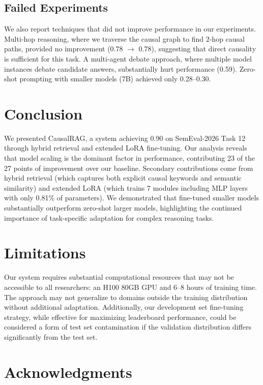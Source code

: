 \documentclass[11pt]{article}
\begin{document}
\subsection{Failed Experiments}

We also report techniques that did not improve performance in our experiments. Multi-hop reasoning, where we traverse the causal graph to find 2-hop causal paths, provided no improvement (0.78 $\rightarrow$ 0.78), suggesting that direct causality is sufficient for this task. A multi-agent debate approach, where multiple model instances debate candidate answers, substantially hurt performance (0.59). Zero-shot prompting with smaller models (7B) achieved only 0.28--0.30.

\section{Conclusion}

We presented CausalRAG, a system achieving 0.90 on SemEval-2026 Task 12 through hybrid retrieval and extended LoRA fine-tuning. Our analysis reveals that model scaling is the dominant factor in performance, contributing 23 of the 27 points of improvement over our baseline. Secondary contributions come from hybrid retrieval (which captures both explicit causal keywords and semantic similarity) and extended LoRA (which trains 7 modules including MLP layers with only 0.81\% of parameters). We demonstrated that fine-tuned smaller models substantially outperform zero-shot larger models, highlighting the continued importance of task-specific adaptation for complex reasoning tasks.

\section*{Limitations}

Our system requires substantial computational resources that may not be accessible to all researchers: an H100 80GB GPU and 6--8 hours of training time. The approach may not generalize to domains outside the training distribution without additional adaptation. Additionally, our development set fine-tuning strategy, while effective for maximizing leaderboard performance, could be considered a form of test set contamination if the validation distribution differs significantly from the test set.

\section*{Acknowledgments}
\end{document}
